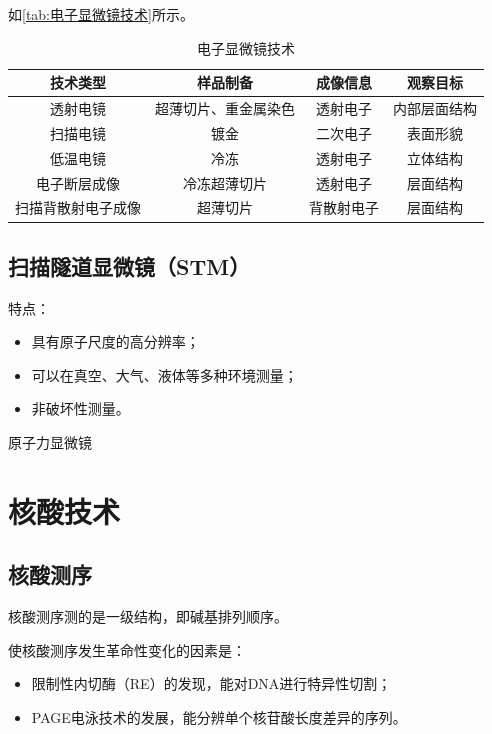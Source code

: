 如\autoref{tab:电子显微镜技术}所示。

\begin{table}[htbp]
	\centering
	\begin{tabularx}{\textwidth}{|c|c|C|C|}
		\hline
		\textbf{技术类型} & \textbf{样品制备} & \textbf{成像信息} & \textbf{观察目标} \\ \hline
		透射电镜 & 超薄切片、重金属染色 & 透射电子 & 内部层面结构 \\ \hline
		扫描电镜 & 镀金 & 二次电子 & 表面形貌 \\ \hline
		低温电镜 & 冷冻 & 透射电子 & 立体结构 \\ \hline
		电子断层成像 & 冷冻超薄切片 & 透射电子 & 层面结构 \\ \hline
		扫描背散射电子成像 & 超薄切片 & 背散射电子 & 层面结构 \\ \hline
	\end{tabularx}
	\caption{电子显微镜技术}
	\label{tab:电子显微镜技术}
\end{table}

\subsection{扫描隧道显微镜（STM）}

特点：
\begin{itemize}
	\item 具有原子尺度的高分辨率；
	\item 可以在真空、大气、液体等多种环境测量；
	\item 非破坏性测量。
\end{itemize}

原子力显微镜


\section{核酸技术}

\subsection{核酸测序}

核酸测序测的是一级结构，即碱基排列顺序。

使核酸测序发生革命性变化的因素是：
\begin{itemize}
	\item 限制性内切酶（RE）的发现，能对DNA进行特异性切割；
	\item PAGE电泳技术的发展，能分辨单个核苷酸长度差异的序列。
\end{itemize}

